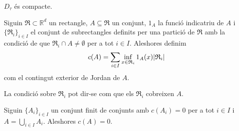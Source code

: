 \documentclass[../Apunts.tex]{subfiles}
\begin{document}
	\begin{observation}
		\(D_{\tau}\) és compacte.%
	\end{observation}
	\begin{definition}
		\label{def:contingut exterior de Jordan}
		Siguin \(\mathfrak{R}\subset\mathbb{R}^{d}\) un rectangle, \(A\subseteq \mathfrak{R}\) un conjunt, \(1_{A}\) la funció indicatriu de \(A\) i \(\{\mathfrak{R}_{i}\}_{i\in I}\) el conjunt de subrectangles definits per una partició de \(\mathfrak{R}\) amb la condició de que \(\mathfrak{R}_{i}\cap A\neq\emptyset\) per a tot \(i\in I\). Aleshores definim
		\[c(A)=\sum_{i\in I}\inf_{x\in \mathfrak{R}_{i}}1_{A}(x)\abs{\mathfrak{R}_{i}}\]
		com el contingut exterior de Jordan de \(A\).
	\end{definition}
	\begin{note}
		La condició sobre \(\mathfrak{R}_{i}\) pot dir-se com que els \(\mathfrak{R}_{i}\) cobreixen \(A\).
	\end{note}
	\begin{observation}
		Siguin \(\{A_{i}\}_{i\in I}\) un conjunt finit de conjunts amb \(c(A_{i})=0\) per a tot \(i\in I\) i \(A=\bigcup_{i\in I}A_{i}\). Aleshores \(c\left(A\right)=0\).
	\end{observation}
\end{document}

